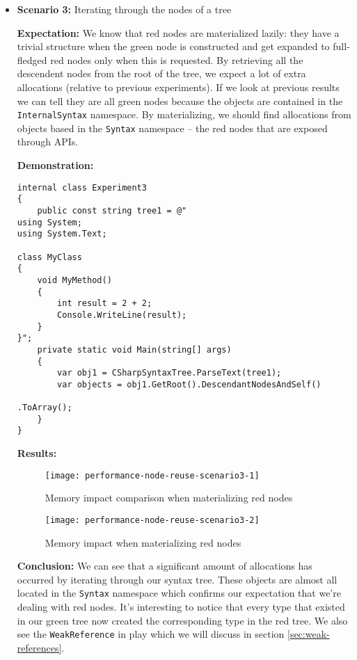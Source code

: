 \begin{itemize}
\item \textbf{Scenario 3:} Iterating through the nodes of a tree

\textbf{Expectation:} We know that red nodes are materialized lazily: they have a trivial structure when the green node is constructed and get expanded to full-fledged red nodes only when this is requested. By retrieving all the descendent nodes from the root of the tree, we expect a lot of extra allocations (relative to previous experiments). If we look at previous results we can tell they are all green nodes because the objects are contained in the \texttt{InternalSyntax} namespace. By materializing, we should find allocations from objects based in the \texttt{Syntax} namespace -- the red nodes that are exposed through APIs.

\textbf{Demonstration:} 

\begin{lstlisting}
internal class Experiment3
{
    public const string tree1 = @"
using System;
using System.Text;

class MyClass 
{
    void MyMethod()
    {
        int result = 2 + 2;
        Console.WriteLine(result);
    }
}";
    private static void Main(string[] args)
	{
		var obj1 = CSharpSyntaxTree.ParseText(tree1);
		var objects = obj1.GetRoot().DescendantNodesAndSelf()
															  .ToArray();
	}
}
\end{lstlisting}

\textbf{Results:}

\begin{figure}[H]
\centering
\texttt{[image: performance-node-reuse-scenario3-1]}
\caption{Memory impact comparison when materializing red nodes}
\label{img:performance-node-reuse-scenario3-1}
\end{figure}

\begin{figure}[H]
\centering
\texttt{[image: performance-node-reuse-scenario3-2]}
\caption{Memory impact when materializing red nodes}
\label{img:performance-node-reuse-scenario3-2}
\end{figure}

\textbf{Conclusion:} We can see that a significant amount of allocations has occurred by iterating through our syntax tree. These objects are almost all located in the \texttt{Syntax} namespace which confirms our expectation that we're dealing with red nodes. It's interesting to notice that every type that existed in our green tree now created the corresponding type in the red tree. We also see the \texttt{WeakReference} in play which we will discuss in section \ref{sec:weak-references}.




\end{itemize}